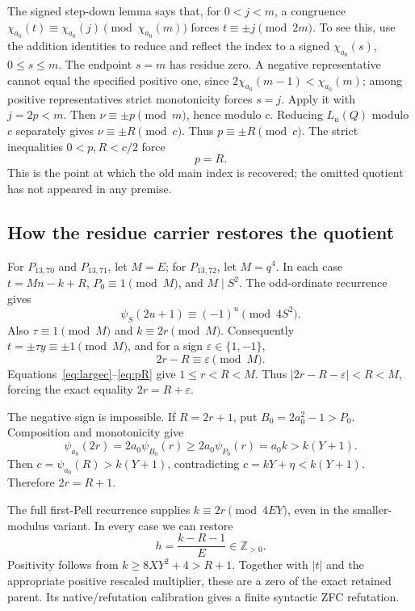 The signed step-down lemma says that, for $0<j<m$, a congruence
$\chi_{a_0}(t)\equiv\chi_{a_0}(j)\pmod{\chi_{a_0}(m)}$
forces $t\equiv\pm j\pmod{2m}$. To see this, use the addition
identities to reduce and reflect the index to a signed
$\chi_{a_0}(s)$, $0\le s\le m$. The endpoint $s=m$ has residue zero.
A negative representative cannot equal the specified positive one,
since $2\chi_{a_0}(m-1)<\chi_{a_0}(m)$; among positive
representatives strict monotonicity forces $s=j$.
Apply it with $j=2p<m$. Then $\nu\equiv\pm p\pmod m$, hence
modulo $c$. Reducing $L_u(Q)$ modulo $c$ separately gives
$\nu\equiv\pm R\pmod c$. Thus $p\equiv\pm R\pmod c$.
The strict inequalities $0<p,R<c/2$ force
\begin{equation}\label{eq:pR}
 p=R.
\end{equation}
This is the point at which the old main index is recovered; the omitted
quotient has not appeared in any premise.

\subsection{How the residue carrier restores the quotient}

For $P_{13,70}$ and $P_{13,71}$, let $M=E$; for $P_{13,72}$, let
$M=q^4$. In each case $t=Mn-k+R$, $P_0\equiv1\pmod M$, and
$M\mid S^2$. The odd-ordinate recurrence gives
\begin{equation}\label{eq:oddres}
 \psi_S(2u+1)\equiv(-1)^u\pmod{4S^2}.
\end{equation}
Also $\tau\equiv1\pmod M$ and $k\equiv2r\pmod M$.
Consequently $t=\pm\tau y\equiv\pm1\pmod M$, and for a sign
$\varepsilon\in\{1,-1\}$,
\[
 2r-R\equiv\varepsilon\pmod M.
\]
Equations~\eqref{eq:largec}--\eqref{eq:pR} give $1\le r<R<M$.
Thus $|2r-R-\varepsilon|<R<M$, forcing the exact equality
$2r=R+\varepsilon$.

The negative sign is impossible. If $R=2r+1$, put $B_0=2a_0^2-1>P_0$.
Composition and monotonicity give
\[
 \psi_{a_0}(2r)=2a_0\psi_{B_0}(r)
     \ge2a_0\psi_{P_0}(r)=a_0k>k(Y+1).
\]
Then $c=\psi_{a_0}(R)>k(Y+1)$, contradicting
$c=kY+\eta<k(Y+1)$. Therefore $2r=R+1$.

The full first-Pell recurrence supplies $k\equiv2r\pmod{4EY}$,
even in the smaller-modulus variant. In every case we can restore
\begin{equation}\label{eq:hrestore}
 h=\frac{k-R-1}{E}\in\mathbb Z_{>0}.
\end{equation}
Positivity follows from $k\ge8XY^2+4>R+1$.
Together with $|t|$ and the appropriate positive rescaled multiplier,
these are a zero of the exact retained parent. Its native/refutation
calibration gives a finite syntactic ZFC refutation.

